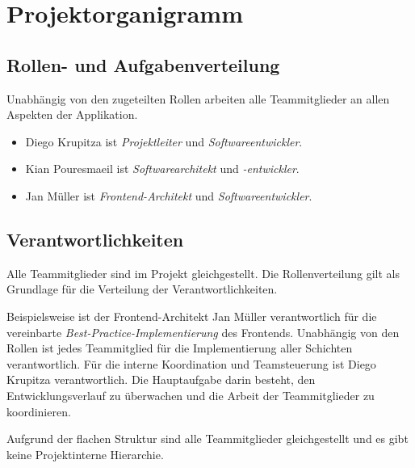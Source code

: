 \section{Projektorganigramm}

\subsection{Rollen- und Aufgabenverteilung}

Unabhängig von den zugeteilten Rollen arbeiten alle Teammitglieder an allen Aspekten der Applikation.

\begin{itemize}
  \item Diego Krupitza ist \textit{Projektleiter} und \textit{Softwareentwickler}.
  \item Kian Pouresmaeil ist \textit{Softwarearchitekt} und \textit{-entwickler}.
  \item Jan Müller ist \textit{Frontend-Architekt} und \textit{Softwareentwickler}.
\end{itemize}

\subsection{Verantwortlichkeiten}

Alle Teammitglieder sind im Projekt gleichgestellt.
Die Rollenverteilung gilt als Grundlage für die Verteilung der Verantwortlichkeiten.

Beispielsweise ist der Frontend-Architekt Jan Müller verantwortlich für die vereinbarte \textit{Best-Practice-Implementierung} des Frontends.
Unabhängig von den Rollen ist jedes Teammitglied für die Implementierung aller Schichten verantwortlich.
Für die interne Koordination und Teamsteuerung ist Diego Krupitza verantwortlich.
Die Hauptaufgabe darin besteht, den Entwicklungsverlauf zu überwachen und die Arbeit der Teammitglieder zu koordinieren.

Aufgrund der flachen Struktur sind alle Teammitglieder gleichgestellt und es gibt keine Projektinterne Hierarchie.
